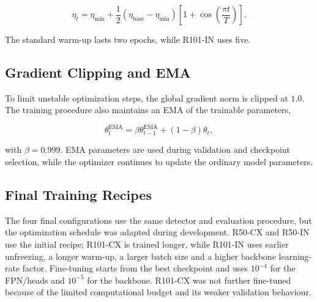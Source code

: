 \documentclass[11pt,a4paper]{article}
\begin{document}
\begin{equation}
\eta_t=\eta_{\min}+\frac{1}{2}(\eta_{\mathrm{base}}-\eta_{\min})
\left[1+\cos\left(\frac{\pi t}{T}\right)\right].
\end{equation}

The standard warm-up lasts two epochs, while R101-IN uses five.

\subsection{Gradient Clipping and EMA}
\label{subsec:gradient_ema}

To limit unstable optimization steps, the global gradient norm is clipped at $1.0$. The training procedure also maintains an EMA of the trainable parameters,

\begin{equation}
\theta_t^{\mathrm{EMA}}=\beta\theta_{t-1}^{\mathrm{EMA}}+(1-\beta)\theta_t,
\end{equation}

with $\beta=0.999$. EMA parameters are used during validation and checkpoint selection, while the optimizer continues to update the ordinary model parameters.

\subsection{Final Training Recipes}
\label{subsec:final_recipes}

The four final configurations use the same detector and evaluation procedure, but the optimization schedule was adapted during development. R50-CX and R50-IN use the initial recipe; R101-CX is trained longer, while R101-IN uses earlier unfreezing, a longer warm-up, a larger batch size and a higher backbone learning-rate factor. Fine-tuning starts from the best checkpoint and uses $10^{-4}$ for the FPN/heads and $10^{-5}$ for the backbone. R101-CX was not further fine-tuned because of the limited computational budget and its weaker validation behaviour.
\end{document}
